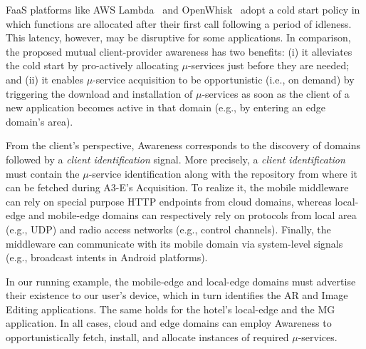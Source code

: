 FaaS platforms like AWS Lambda~\cite{AWSLambda}
and OpenWhisk~\cite{OpenWhisk} adopt a cold start policy in which functions are allocated after their first call following a period of idleness. This latency, however, may be disruptive for some applications. In comparison, the proposed mutual client-provider awareness 
has two benefits: (i) it alleviates the cold start by pro-actively allocating $\mu$-services just before they are needed; and (ii) it enables $\mu$-service acquisition to be opportunistic (i.e., on demand) by triggering the download and installation of $\mu$-services as soon as the client of a new application becomes active in that domain (e.g., by entering an edge domain's area).


%	
%	




From the client's perspective, Awareness corresponds to the discovery of domains followed by a \textit{client identification} signal. More precisely, a \textit{client identification} must contain the $\mu$-service identification along with the repository from where it can be fetched during A3-E's Acquisition. To realize it, the mobile middleware can rely on special purpose HTTP endpoints from cloud domains, whereas local-edge and mobile-edge domains can respectively rely on protocols from local area (e.g., UDP) and radio access networks (e.g., control channels). Finally, the middleware can communicate with its mobile domain via system-level signals (e.g., broadcast intents in Android platforms).

In our running example, the mobile-edge and local-edge domains must advertise their existence to our user's device, which in turn identifies the AR and Image Editing applications. The same holds for the hotel's local-edge and the MG application. In all cases, cloud and edge domains can employ Awareness to opportunistically fetch, install, and allocate instances of required $\mu$-services.


